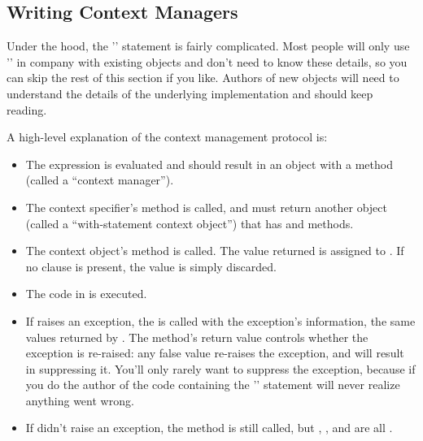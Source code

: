 \documentclass{howto}
\begin{document}
\subsection{Writing Context Managers\label{context-managers}}

Under the hood, the '' statement is fairly complicated.
Most people will only use '' in company with existing
objects and don't need to know these details, so you can skip the rest
of this section if you like.  Authors of new objects will need to
understand the details of the underlying implementation and should
keep reading.

A high-level explanation of the context management protocol is:

\begin{itemize}
\item The expression is evaluated and should result in an object
with a  method (called a ``context manager'').

\item The context specifier's  method is called, 
and must return another object (called a ``with-statement context object'') that has
 and  methods.

\item The context object's  method is called.  The value
returned is assigned to .  If no  clause
is present, the value is simply discarded.

\item The code in  is executed.

\item If  raises an exception, the
 is called
with the exception's information, the same values returned by
.  The method's return value controls whether
the exception is re-raised: any false value re-raises the exception,
and  will result in suppressing it.  You'll only rarely
want to suppress the exception, because if you do
the author of the code containing the
'' statement will never realize anything went wrong.

\item If  didn't raise an exception, 
the  method is still called,
but , , and  are all .

\end{itemize}
\end{document}
